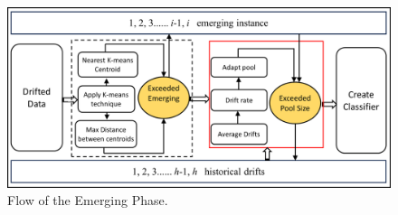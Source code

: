 \begin{figure}[ht]
	\centering
	\includegraphics[width=1\linewidth]{5_Emerging/images/pro2.png}
	\caption{Flow of the Emerging Phase.}
	\label{fig:proposal_step_2}
\end{figure}
